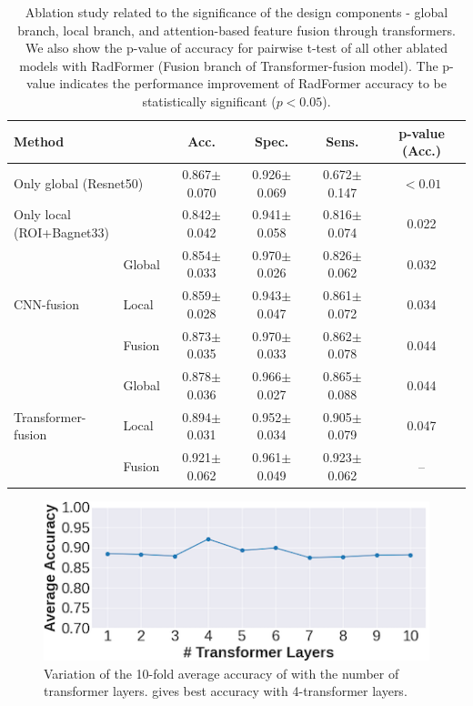 \begin{table}[!ht]
   \centering
   \footnotesize
	\begin{tabular}{llcccc}
		\toprule
		\multicolumn{2}{l}{\textbf{Method}} & \textbf{Acc.} 
		& \textbf{Spec.} & \textbf{Sens.} & \textbf{p-value (Acc.)} \\
		\midrule
		\multicolumn{2}{l}{Only global (Resnet50)} & 0.867$\pm$0.070 & 0.926$\pm$0.069 & 0.672$\pm$0.147 & $<0.01$ \\
		\midrule
		\multicolumn{2}{l}{Only local (ROI+Bagnet33)} & 0.842$\pm$0.042 & 0.941$\pm$0.058 & 0.816$\pm$0.074 & 0.022\\
		\midrule
		\multirow{3}{*}{CNN-fusion}
		& Global & 0.854$\pm$0.033 & 0.970$\pm$0.026 & 0.826$\pm$0.062 & 0.032 \\
		& Local & 0.859$\pm$0.028 & 0.943$\pm$0.047 & 0.861$\pm$0.072 & 0.034\\
		& Fusion & 0.873$\pm$0.035 & 0.970$\pm$0.033 & 0.862$\pm$0.078 & 0.044\\
		\midrule
		\multirow{3}{*}{Transformer-fusion}
		& Global & 0.878$\pm$0.036 & 0.966$\pm$0.027 & 0.865$\pm$0.088 & 0.044\\
		& Local & 0.894$\pm$0.031 & 0.952$\pm$0.034 & 0.905$\pm$0.079 & 0.047\\
		& Fusion & 0.921$\pm$0.062 & 0.961$\pm$0.049 & 0.923$\pm$0.062 & -- \\
		\bottomrule
	\end{tabular}
    \caption[Ablation on design components]{Ablation study related to the significance of the design components - global branch, local branch, and attention-based feature fusion through transformers. We also show the p-value of accuracy for pairwise t-test of all other ablated models with RadFormer (Fusion branch of Transformer-fusion model). The p-value indicates the performance improvement of RadFormer accuracy to be statistically significant ($p<0.05$).}
    \label{tab:ablation-parts}
\end{table}

\begin{figure}[t]
    \centering
    \includegraphics[width=0.5\linewidth]{figs/radformer/abl-numlayer.png}
    \caption[Ablation on the transformer layers]{Variation of the 10-fold average accuracy of \radformer with the number of transformer layers. \radformer gives best accuracy with 4-transformer layers.}
    \label{fig:transformer_ablation}
\end{figure}

